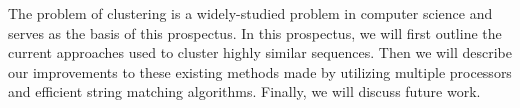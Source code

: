 The problem of clustering is a widely-studied problem in computer science\cite{fasulo_analysis_1999} and serves as the basis of this prospectus.
In this prospectus, we will first outline the current approaches used to cluster highly similar sequences.
Then we will describe our improvements to these existing methods made by utilizing multiple processors and efficient string matching algorithms.
Finally, we will discuss future work.






